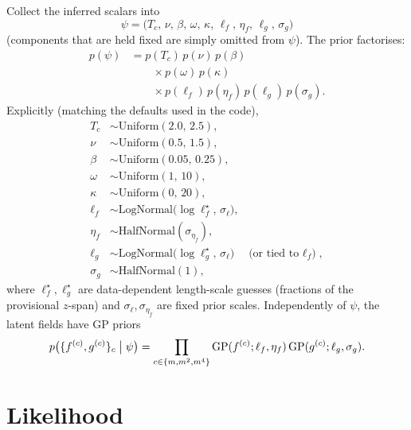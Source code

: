 \documentclass[11pt]{article}
\begin{document}
Collect the inferred scalars into
\begin{equation}
  \psi
    = \bigl(
        T_c,\, \nu,\, \beta,\,
        \omega,\, \kappa,\,
        \ell_f,\, \eta_f,\, \ell_g,\, \sigma_g
      \bigr)
\end{equation}
(components that are held fixed are simply omitted from $\psi$).
The prior factorises:
\begin{align}
  p(\psi)
    &= p(T_c)\, p(\nu)\, p(\beta)
  \nonumber\\
    &\qquad
      \times p(\omega)\, p(\kappa)
  \nonumber\\
    &\qquad
      \times p(\ell_f)\, p(\eta_f)\, p(\ell_g)\, p(\sigma_g).
\end{align}
Explicitly (matching the defaults used in the code),
\begin{align}
  T_c
    &\sim \mathrm{Uniform}(2.0,\, 2.5),
  \\
  \nu
    &\sim \mathrm{Uniform}(0.5,\, 1.5),
  \\
  \beta
    &\sim \mathrm{Uniform}(0.05,\, 0.25),
  \\
  \omega
    &\sim \mathrm{Uniform}(1,\, 10),
  \\
  \kappa
    &\sim \mathrm{Uniform}(0,\, 20),
  \\
  \ell_f
    &\sim \mathrm{LogNormal}\bigl(\log \ell_f^{\star},\, \sigma_\ell\bigr),
  \\
  \eta_f
    &\sim \mathrm{HalfNormal}(\sigma_{\eta_f}),
  \\
  \ell_g
    &\sim \mathrm{LogNormal}\bigl(\log \ell_g^{\star},\, \sigma_\ell\bigr)
      \quad\text{(or tied to $\ell_f$)},
  \\
  \sigma_g
    &\sim \mathrm{HalfNormal}(1),
\end{align}
where $\ell_f^{\star},\ell_g^{\star}$ are data-dependent length-scale
guesses (fractions of the provisional $z$-span) and
$\sigma_\ell,\sigma_{\eta_f}$ are fixed prior scales.
Independently of $\psi$, the latent fields have GP priors
\begin{equation}
  p\bigl(\{f^{(c)},g^{(c)}\}_c \bigm| \psi\bigr)
    = \prod_{c\in\{m,m^2,m^4\}}
      \mathrm{GP}(f^{(c)};\ell_f,\eta_f)\,
      \mathrm{GP}(g^{(c)};\ell_g,\sigma_g).
\end{equation}

\section{Likelihood}
\end{document}
